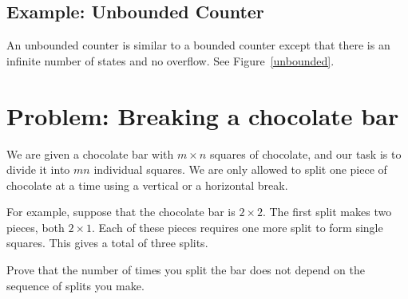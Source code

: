 \documentclass[12pt]{article}
\begin{document}
{\subsection{Example: Unbounded Counter}

An unbounded counter is similar to a bounded counter except that there
is an infinite number of states and no overflow. See
Figure~\ref{unbounded}.

}

\fi

\section{Problem: Breaking a chocolate bar}

We are given a chocolate bar with $m \times n$ squares of
chocolate, and our task is to divide it into $mn$ individual squares.  We
are only allowed to split one piece of chocolate at a time using a
vertical or a horizontal break.

For example, suppose that the chocolate bar is $2 \times 2$.  The
first split makes two pieces, both $2 \times 1$.  Each of these pieces
requires one more split to form single squares.  This gives a total of
three splits.

Prove that the number of times you split the bar does not depend on the sequence of splits you make.
\end{document}
